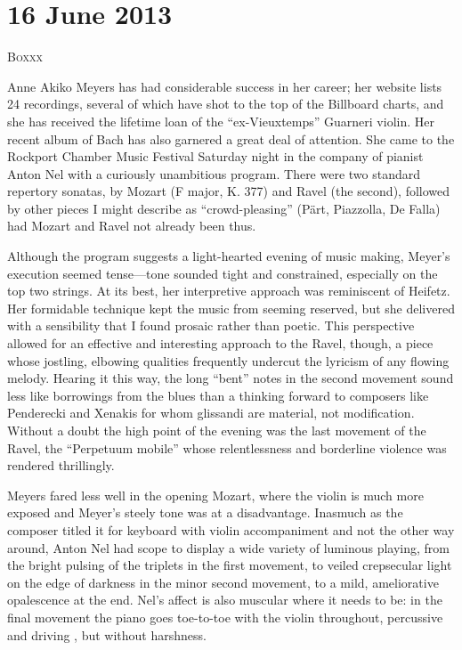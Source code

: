 \chapter{16 June 2013}

\textsc{Boxxx}

Anne Akiko Meyers has had considerable success in her career; her website lists 24 recordings, several of which have shot to the top of the Billboard charts, and she has received the lifetime loan of the “ex-Vieuxtemps” Guarneri violin. Her recent album of Bach has also garnered a great deal of attention. She came to the Rockport Chamber Music Festival Saturday night in the company of pianist Anton Nel with a curiously unambitious program. There were two standard repertory sonatas, by Mozart (F major, K. 377) and Ravel (the second), followed by other pieces I might describe as “crowd-pleasing” (Pärt, Piazzolla, De Falla) had Mozart and Ravel not already been thus.

Although the program suggests a light-hearted evening of music making, Meyer’s execution seemed tense—tone sounded tight and constrained, especially on the top two strings. At its best, her interpretive approach was reminiscent of Heifetz. Her formidable technique kept the music from seeming reserved, but she delivered with a sensibility that I found prosaic rather than poetic. This perspective allowed for an effective and interesting approach to the Ravel, though, a piece whose jostling, elbowing qualities frequently undercut the lyricism of any flowing melody. Hearing it this way, the long “bent” notes in the second movement sound less like borrowings from the blues than a thinking forward to composers like Penderecki and Xenakis for whom glissandi are material, not modification. Without a doubt the high point of the evening was the last movement of the Ravel, the “Perpetuum mobile” whose relentlessness and borderline violence was rendered thrillingly.

Meyers fared less well in the opening Mozart, where the violin is much more exposed and Meyer’s steely tone was at a disadvantage. Inasmuch as the composer titled it for keyboard with violin accompaniment and not the other way around, Anton Nel had scope to display a wide variety of luminous playing, from the bright pulsing of the triplets in the first movement, to veiled crepsecular light on the edge of darkness in the minor second movement, to a mild, ameliorative opalescence at the end. Nel’s affect is also muscular where it needs to be: in the final movement the piano goes toe-to-toe with the violin throughout, percussive and driving , but without harshness.

